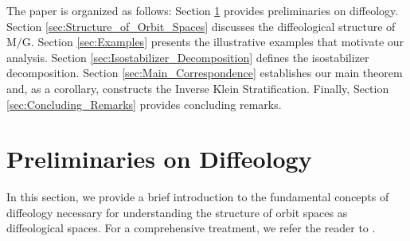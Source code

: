 \documentclass[10pt,reqno,letterpaper,twoside]{amsart}
\theoremstyle{article}
\def \G{\mathrm G}
\def \M{\mathrm M}
\begin{document}
  The paper is organized as follows:
  Section \ref{sec:Preliminaries} provides preliminaries on diffeology.
  Section \ref{sec:Structure_of_Orbit_Spaces} discusses the diffeological structure of $\M/\G$.
  Section \ref{sec:Examples} presents the illustrative examples that motivate our analysis.
  Section \ref{sec:Isostabilizer_Decomposition} defines the isostabilizer decomposition.
  Section \ref{sec:Main_Correspondence} establishes our main theorem and,
  as a corollary,
  constructs the Inverse Klein Stratification.
  Finally,
  Section \ref{sec:Concluding_Remarks} provides concluding remarks.
    
  
  \section{Preliminaries on Diffeology}
  \label{sec:Preliminaries}
  
  In this section,
  we provide a brief introduction to the fundamental concepts of diffeology necessary for understanding the structure of orbit spaces as diffeological spaces.
  For a comprehensive treatment,
  we refer the reader to \cite{PIZ13}.
  
  
\end{document}
